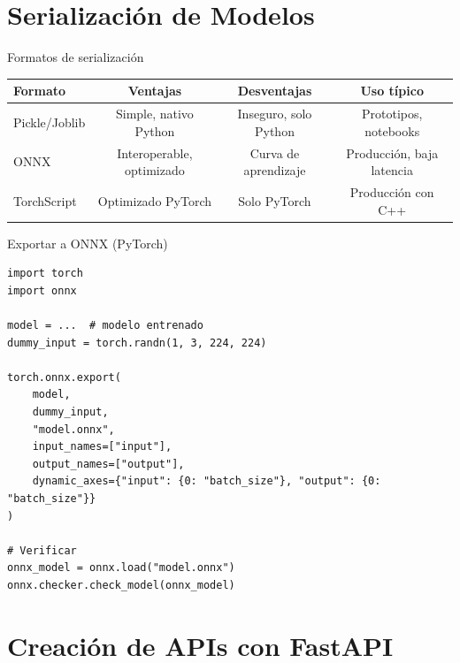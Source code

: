 \documentclass[aspectratio=169, 10pt, xcolor=table]{beamer}
\begin{document}
\section{Serialización de Modelos}

\begin{frame}{Formatos de serialización}
    \begin{table}
        \centering
        \begin{tabular}{l|c|c|c}
            \toprule
            \textbf{Formato} & \textbf{Ventajas} & \textbf{Desventajas} & \textbf{Uso típico} \\
            \midrule
            Pickle/Joblib & Simple, nativo Python & Inseguro, solo Python & Prototipos, notebooks \\
            ONNX & Interoperable, optimizado & Curva de aprendizaje & Producción, baja latencia \\
            TorchScript & Optimizado PyTorch & Solo PyTorch & Producción con C++ \\
            \bottomrule
        \end{tabular}
    \end{table}
\end{frame}

\begin{frame}[fragile]{Exportar a ONNX (PyTorch)}
    \begin{lstlisting}
import torch
import onnx

model = ...  # modelo entrenado
dummy_input = torch.randn(1, 3, 224, 224)

torch.onnx.export(
    model,
    dummy_input,
    "model.onnx",
    input_names=["input"],
    output_names=["output"],
    dynamic_axes={"input": {0: "batch_size"}, "output": {0: "batch_size"}}
)

# Verificar
onnx_model = onnx.load("model.onnx")
onnx.checker.check_model(onnx_model)
    \end{lstlisting}
\end{frame}

\section{Creación de APIs con FastAPI}
\end{document}

